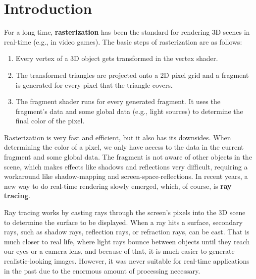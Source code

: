 \chapter{Introduction}

For a long time, \textbf{rasterization} has been the standard for rendering 3D scenes in real-time (e.g., in video games). The basic steps of rasterization are as follows:

\begin{enumerate}
    \item Every vertex of a 3D object gets transformed in the vertex shader.

    \item The transformed triangles are projected onto a 2D pixel grid and a fragment is generated for every pixel that the triangle covers.

    \item The fragment shader runs for every generated fragment. It uses the fragment's data and some global data (e.g., light sources) to determine the final color of the pixel.
\end{enumerate}

Rasterization is very fast and efficient, but it also has its downsides. When determining the color of a pixel, we only have access to the data in the current fragment and some global data. The fragment is not aware of other objects in the scene, which makes effects like shadows and reflections very difficult, requiring a workaround like shadow-mapping and screen-space-reflections. In recent years, a new way to do real-time rendering slowly emerged, which, of course, is \textbf{ray tracing}.

Ray tracing works by casting rays through the screen's pixels into the 3D scene to determine the surface to be displayed. When a ray hits a surface, secondary rays, such as shadow rays, reflection rays, or refraction rays, can be cast. That is much closer to real life, where light rays bounce between objects until they reach our eyes or a camera lens, and because of that, it is much easier to generate realistic-looking images. However, it was never suitable for real-time applications in the past due to the enormous amount of processing necessary. 

